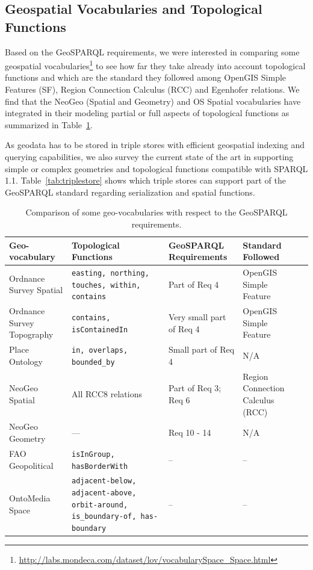 \subsection{Geospatial Vocabularies and Topological Functions}
\label{sec:topofunc}

Based on the GeoSPARQL requirements, we were interested in comparing some geospatial vocabularies\footnote{\url{http://labs.mondeca.com/dataset/lov/vocabularySpace_Space.html}} to see how far they take already into account topological functions and which are the standard they followed among OpenGIS Simple Features (SF), Region Connection Calculus (RCC) and Egenhofer relations. We find that the NeoGeo (Spatial and Geometry) and OS Spatial vocabularies have integrated in their modeling partial or full aspects of topological functions as summarized in Table~\ref{tab:geosparql}.

As geodata has to be stored in triple stores with efficient geospatial indexing and querying capabilities, we also survey the current state of the art  in supporting simple or complex geometries and topological functions compatible with SPARQL 1.1. Table~\ref{tab:triplestore} shows which triple stores can support part of the GeoSPARQL standard regarding serialization and spatial functions.
\begin{table}
\begin{tabularx}{\textwidth}{|X|X|X|X|l}
\hline
\textbf{Geo-vocabulary} & \textbf{Topological Functions} & \textbf{GeoSPARQL Requirements} & \textbf{Standard Followed}\\
\hline
Ordnance Survey Spatial & \texttt{easting, northing, touches, within, contains} & Part of Req 4 & OpenGIS Simple Feature\\ \hline
Ordnance Survey Topography & \texttt{contains, isContainedIn} & Very small part of Req 4 & OpenGIS Simple Feature\\ \hline
Place Ontology & \texttt{in, overlaps, bounded\_by} & Small part of Req 4 & N/A\\
\hline
NeoGeo Spatial & All RCC8 relations & Part of Req 3; Req 6 & Region Connection Calculus (RCC)\\
\hline
NeoGeo Geometry & --- & Req 10 - 14 & N/A\\
\hline
FAO Geopolitical & \texttt{isInGroup, hasBorderWith} & -- & --\\
\hline
OntoMedia Space & \texttt{adjacent-below, adjacent-above, orbit-around, is\_boundary-of, has-boundary} & -- & --\\
\hline
\end{tabularx}
\caption{Comparison of some geo-vocabularies with respect to the GeoSPARQL requirements.}
\label{tab:geosparql}
\end{table}


